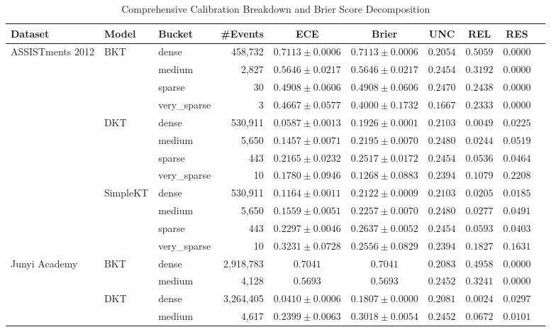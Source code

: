 \begin{table}[t]
\caption{Comprehensive Calibration Breakdown and Brier Score Decomposition}
\label{tab:calib_full}
\centering
\small
\begin{tabular}{lllrcccccc}
\toprule
Dataset & Model & Bucket & \#Events & ECE & Brier & UNC & REL & RES \\
\midrule
ASSISTments 2012 & BKT & dense & 458,732 & $0.7113 \pm 0.0006$ & $0.7113 \pm 0.0006$ & $0.2054$ & $0.5059$ & $0.0000$ \\
 &  & medium & 2,827 & $0.5646 \pm 0.0217$ & $0.5646 \pm 0.0217$ & $0.2454$ & $0.3192$ & $0.0000$ \\
 &  & sparse & 30 & $0.4908 \pm 0.0606$ & $0.4908 \pm 0.0606$ & $0.2470$ & $0.2438$ & $0.0000$ \\
 &  & very\_sparse & 3 & $0.4667 \pm 0.0577$ & $0.4000 \pm 0.1732$ & $0.1667$ & $0.2333$ & $0.0000$ \\
 & DKT & dense & 530,911 & $0.0587 \pm 0.0013$ & $0.1926 \pm 0.0001$ & $0.2103$ & $0.0049$ & $0.0225$ \\
 &  & medium & 5,650 & $0.1457 \pm 0.0071$ & $0.2195 \pm 0.0070$ & $0.2480$ & $0.0244$ & $0.0519$ \\
 &  & sparse & 443 & $0.2165 \pm 0.0232$ & $0.2517 \pm 0.0172$ & $0.2454$ & $0.0536$ & $0.0464$ \\
 &  & very\_sparse & 10 & $0.1780 \pm 0.0946$ & $0.1268 \pm 0.0883$ & $0.2394$ & $0.1079$ & $0.2208$ \\
 & SimpleKT & dense & 530,911 & $0.1164 \pm 0.0011$ & $0.2122 \pm 0.0009$ & $0.2103$ & $0.0205$ & $0.0185$ \\
 &  & medium & 5,650 & $0.1559 \pm 0.0051$ & $0.2257 \pm 0.0070$ & $0.2480$ & $0.0277$ & $0.0491$ \\
 &  & sparse & 443 & $0.2297 \pm 0.0046$ & $0.2637 \pm 0.0052$ & $0.2454$ & $0.0593$ & $0.0403$ \\
 &  & very\_sparse & 10 & $0.3231 \pm 0.0728$ & $0.2556 \pm 0.0829$ & $0.2394$ & $0.1827$ & $0.1631$ \\
\midrule
Junyi Academy & BKT & dense & 2,918,783 & $0.7041$ & $0.7041$ & $0.2083$ & $0.4958$ & $0.0000$ \\
 &  & medium & 4,128 & $0.5693$ & $0.5693$ & $0.2452$ & $0.3241$ & $0.0000$ \\
 & DKT & dense & 3,264,405 & $0.0410 \pm 0.0006$ & $0.1807 \pm 0.0000$ & $0.2081$ & $0.0024$ & $0.0297$ \\
 &  & medium & 4,617 & $0.2399 \pm 0.0063$ & $0.3018 \pm 0.0054$ & $0.2452$ & $0.0672$ & $0.0101$ \\

\end{tabular}
\end{table}
